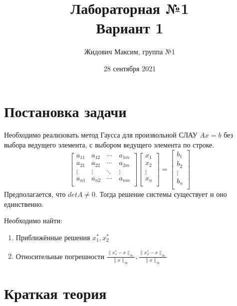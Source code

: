 \documentclass[12pt]{report}
\title{\vspace{-3cm}Лабораторная №1\\ \vspace{0.5cm}Вариант 1}
\author{Жидович Максим, группа №1}
\date{28 сентября 2021}
\begin{document}
\maketitle

\section{Постановка задачи}

Необходимо реализовать метод Гаусса для произвольной СЛАУ $Ax = b$ без выбора ведущего элемента, с выбором ведущего элемента по строке.
\[
\begin{bmatrix}
a_{11} & a_{12}  & \cdots   & a_{1m}   \\
a_{21} & a_{22}  & \cdots   & a_{2m}  \\
\vdots & \vdots  & \ddots   & \vdots  \\
a_{n1} & a_{n2}  & \cdots\  & a_{nm}  \\
\end{bmatrix}
\begin{bmatrix}
x_{1} \\
x_{2} \\
\vdots \\
x_{n} \\
\end{bmatrix}
=
\begin{bmatrix}
b_{1} \\
b_{2} \\
\vdots \\
b_{n} \\
\end{bmatrix}
\]
Предполагается, что $detA \ne 0$. Тогда решение системы существует и оно единственно.

Необходимо найти:
\begin{enumerate}
	\item Приближённые решения $x_{1}^*, x_{2}^*$
	\item Относительные погрешности $\frac{\|x_{1}^* - x\|_{\infty}}{\|x\|_{\infty}}, \frac{\|x_{2}^* - x\|_{\infty}}{\|x\|_{\infty}}$
\end{enumerate}

\section{Краткая теория}
\end{document}
